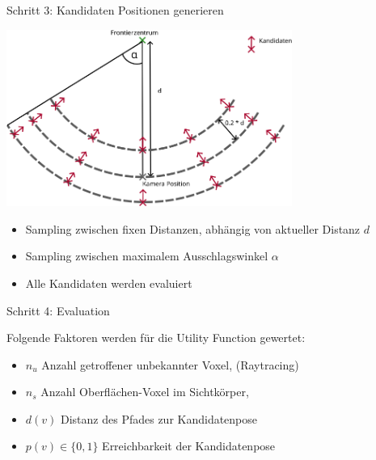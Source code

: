 \documentclass{beamer}
\begin{document}
\begin{frame}{Schritt 3: Kandidaten Positionen generieren}
	\begin{block}{}

		\begin{center}
			\includegraphics[width=0.7\textwidth]{Graphics/view_point_gen_v2.png}
		\end{center}
		\begin{itemize}
			\item Sampling zwischen fixen Distanzen, abhängig von aktueller Distanz $d$
			\item Sampling zwischen maximalem Ausschlagswinkel $\alpha$
			\item Alle Kandidaten werden evaluiert
		\end{itemize}
	\end{block}

\end{frame}

\begin{frame}{Schritt 4: Evaluation}
	\begin{block}{}
		Folgende Faktoren werden für die Utility Function gewertet:
		\begin{itemize}
			\item $n_{u}$ Anzahl getroffener unbekannter Voxel, (Raytracing)
			\item $n_s$ Anzahl Oberflächen-Voxel im Sichtkörper,
			\item $d(v)$ Distanz des Pfades zur Kandidatenpose
			\item $p(v) \in \{0,1\}$ Erreichbarkeit der Kandidatenpose
		\end{itemize}
	\end{block}
\end{frame}
\end{document}
